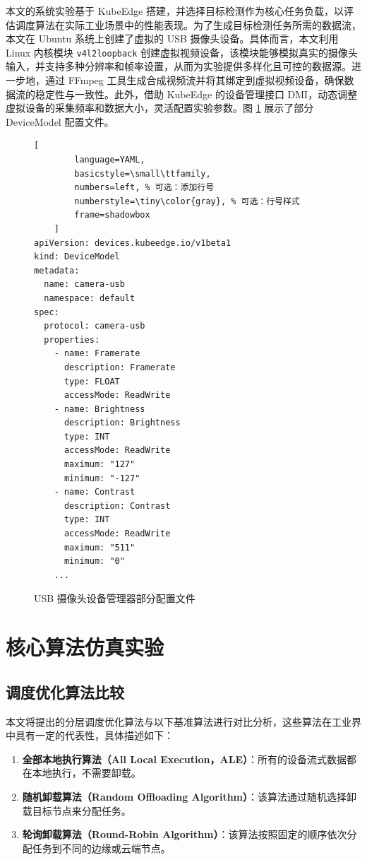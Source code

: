本文的系统实验基于 KubeEdge 搭建，并选择目标检测作为核心任务负载，以评估调度算法在实际工业场景中的性能表现。为了生成目标检测任务所需的数据流，本文在 Ubuntu 系统上创建了虚拟的 USB 摄像头设备。具体而言，本文利用 Linux 内核模块 \texttt{v4l2loopback} 创建虚拟视频设备，该模块能够模拟真实的摄像头输入，并支持多种分辨率和帧率设置，从而为实验提供多样化且可控的数据源。进一步地，通过 FFmpeg 工具生成合成视频流并将其绑定到虚拟视频设备，确保数据流的稳定性与一致性。此外，借助 KubeEdge 的设备管理接口 DMI，动态调整虚拟设备的采集频率和数据大小，灵活配置实验参数。图 \ref{fig:dmi-config} 展示了部分 DeviceModel 配置文件。

\begin{figure}[ht]
    \centering
    \begin{lstlisting}[
        language=YAML,
        basicstyle=\small\ttfamily, 
        numbers=left, % 可选：添加行号
        numberstyle=\tiny\color{gray}, % 可选：行号样式
        frame=shadowbox
    ]
apiVersion: devices.kubeedge.io/v1beta1
kind: DeviceModel
metadata:
  name: camera-usb
  namespace: default
spec:
  protocol: camera-usb
  properties:
    - name: Framerate
      description: Framerate
      type: FLOAT
      accessMode: ReadWrite
    - name: Brightness
      description: Brightness
      type: INT
      accessMode: ReadWrite
      maximum: "127"
      minimum: "-127"
    - name: Contrast
      description: Contrast
      type: INT
      accessMode: ReadWrite
      maximum: "511"
      minimum: "0"
    ...
\end{lstlisting}
    \caption{USB 摄像头设备管理器部分配置文件}
    \label{fig:dmi-config}
\end{figure}

\section{核心算法仿真实验}

\subsection{调度优化算法比较}

本文将提出的分层调度优化算法与以下基准算法进行对比分析，这些算法在工业界中具有一定的代表性，具体描述如下：

\begin{enumerate}
    \item \textbf{全部本地执行算法（All Local Execution，ALE）}：所有的设备流式数据都在本地执行，不需要卸载。
    \item \textbf{随机卸载算法（Random Offloading Algorithm）}：该算法通过随机选择卸载目标节点来分配任务。
    \item \textbf{轮询卸载算法（Round-Robin Algorithm）}：该算法按照固定的顺序依次分配任务到不同的边缘或云端节点。
\end{enumerate}

